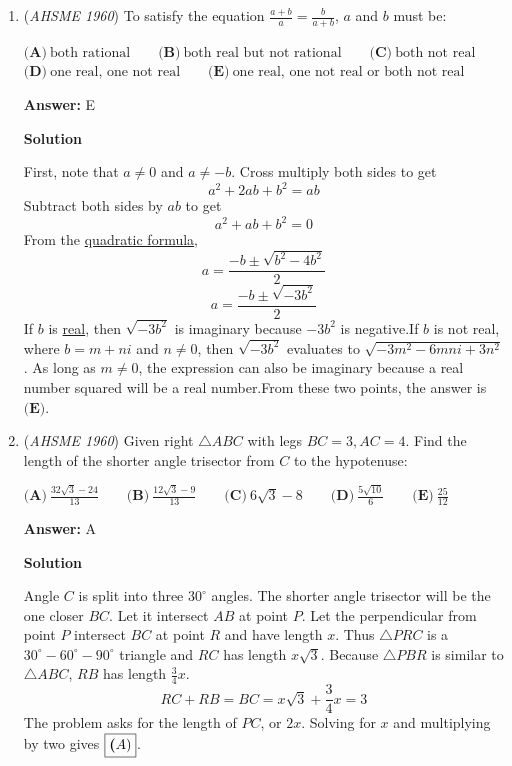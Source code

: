 \begin{enumerate}
 


 


	\item (\textit{AHSME 1960}) To satisfy the equation $\frac{a+b}{a}=\frac{b}{a+b}$, $a$ and $b$ must be:


 $\textbf{(A)}\ \text{both rational}\qquad\textbf{(B)}\ \text{both real but not rational}\qquad\textbf{(C)}\ \text{both not real}\qquad$
$\textbf{(D)}\ \text{one real, one not real}\qquad\textbf{(E)}\ \text{one real, one not real or both not real}$

 \textbf{Answer: }E



\textbf{Solution}

First, note that $a \neq 0$ and $a \neq -b$.  Cross multiply both sides to get
 \[a^2 + 2ab + b^2 = ab\]Subtract both sides by $ab$ to get
 \[a^2 + ab + b^2 = 0\]From the \href{https://artofproblemsolving.com/wiki/index.php?title=Quadratic\_formula}{quadratic formula},
 \[a = \frac{-b \pm \sqrt{b^2 - 4b^2}}{2}\]
 \[a = \frac{-b \pm \sqrt{-3b^2}}{2}\]If $b$ is \href{https://artofproblemsolving.com/wiki/index.php?title=Real}{real}, then $\sqrt{-3b^2}$ is imaginary because $-3b^2$ is negative.If $b$ is not real, where $b = m+ni$ and $n \neq 0$, then $\sqrt{-3b^2}$ evaluates to $\sqrt{-3m^2 - 6mni + 3n^2}$.  As long as $m \neq 0$, the expression can also be imaginary because a real number squared will be a real number.From these two points, the answer is $\boxed{\textbf{(E)}}$.

 


 


	\item (\textit{AHSME 1960}) Given right $\triangle ABC$ with legs $BC=3, AC=4$. Find the length of the shorter angle trisector from $C$ to the hypotenuse:


 $\textbf{(A)}\ \frac{32\sqrt{3}-24}{13}\qquad\textbf{(B)}\ \frac{12\sqrt{3}-9}{13}\qquad\textbf{(C)}\ 6\sqrt{3}-8\qquad\textbf{(D)}\ \frac{5\sqrt{10}}{6}\qquad\textbf{(E)}\ \frac{25}{12}\qquad$

 \textbf{Answer: }A



\textbf{Solution}

Angle $C$ is split into three $30^{\circ}$ angles. The shorter angle trisector will be the one closer $BC$. Let it intersect $AB$ at point $P$. Let the perpendicular from point $P$ intersect $BC$ at point $R$ and have length $x$. Thus $\triangle PRC$ is a $30^{\circ}-60^{\circ}-90^{\circ}$ triangle and $RC$ has length $x\sqrt{3}$. Because $\triangle PBR$ is similar to $\triangle ABC$, $RB$ has length $\frac{3}{4}x$. 
 \[RC+RB=BC=x\sqrt{3}+\frac{3}{4}x=3\]The problem asks for the length of $PC$, or $2x$. Solving for $x$ and multiplying by two gives $\boxed{\textbf(A)}$.

 


 


\end{enumerate}